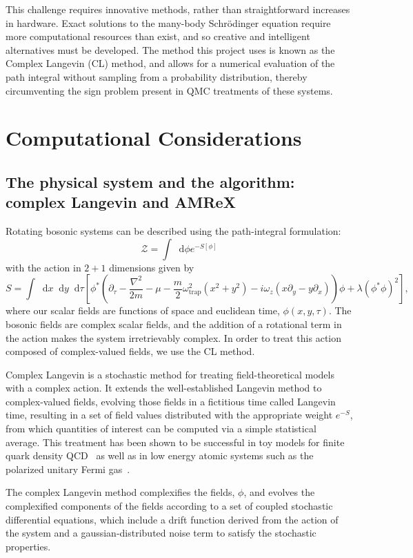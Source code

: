 \documentclass[onecolumn, 12pt]{article}
\newcommand{\beq}{\begin{equation}}
\newcommand{\eeq}{\end{equation}}
\def\CZ{{\mathcal Z}}
\def\del{{\nabla}}
\newcommand*\dif{\mathop{}\!\mathrm{d}}
\begin{document}
This challenge requires innovative methods, rather than straightforward increases in hardware. Exact solutions to the many-body Schr\"{o}dinger equation require more computational resources than exist, and so creative and intelligent alternatives must be developed. The method this project uses is known as the Complex Langevin (CL) method, and allows for a numerical evaluation of the path integral without sampling from a probability distribution, thereby circumventing the sign problem present in QMC treatments of these systems. 

\section{Computational Considerations}
\subsection{The physical system and the algorithm: complex Langevin and AMReX}
Rotating bosonic systems can be described using the path-integral formulation:
%
\beq
\CZ = \int \dif \phi e^{-S[\phi]}
\eeq
%
with the action in $2+1$ dimensions given by
%
\beq
S = \int \dif x \dif y \dif\tau \left[ \phi^{*}\left( \partial_{\tau} - \frac{\del^{2}}{2m} - \mu  - \frac{m}{2} \omega_{\text{trap}}^{2}(x^{2}+y^{2})- i \omega_{z}(x \partial_{y} - y\partial_{x})\right)\phi + \lambda (\phi^{*} \phi)^{2}\right],
\eeq 
%
where our scalar fields are functions of space and euclidean time, $\phi(x,y,\tau)$. The bosonic fields are complex scalar fields, and the addition of a rotational term in the action makes the system irretrievably complex. In order to treat this action composed of complex-valued fields, we use the CL method.

Complex Langevin is a stochastic method for treating field-theoretical models with a complex action. It extends the well-established Langevin method to complex-valued fields, evolving those fields in a fictitious time called Langevin time, resulting in a set of field values distributed with the appropriate weight $e^{-S}$, from which quantities of interest can be computed via a simple statistical average. This treatment has been shown to be successful in toy models for finite quark density QCD~\cite{BergerCLReview} as well as in low energy atomic systems such as the polarized unitary Fermi gas~\cite{BergerCLReview}. 

The complex Langevin method complexifies the fields, $\phi$, and evolves the complexified components of the fields according to a set of coupled stochastic differential equations, which include a drift function derived from the action of the system and a gaussian-distributed noise term to satisfy the stochastic properties. 
\end{document}
